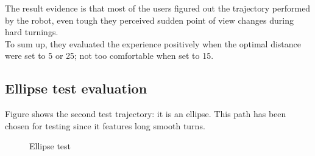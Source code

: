 The result evidence is that most of the users figured out the
trajectory performed by the robot, even tough they perceived
sudden point of view changes during hard turnings.
\\
To sum up, they evaluated the experience positively when the
optimal distance were set to 5 or 25; not too comfortable
when set to 15.


\subsection{Ellipse test evaluation}
\label{performance_evaluation:tests_result:ellipsetest}

Figure  shows the second test trajectory:
it is an ellipse. This path has been chosen for testing since it
features long smooth turns.

\begin{figure}[!htp]
  \begin{center}

    \vspace*{30pt}
  \end{center}
  \caption{Ellipse test}
  \label{fig:ellipse}
\end{figure}

